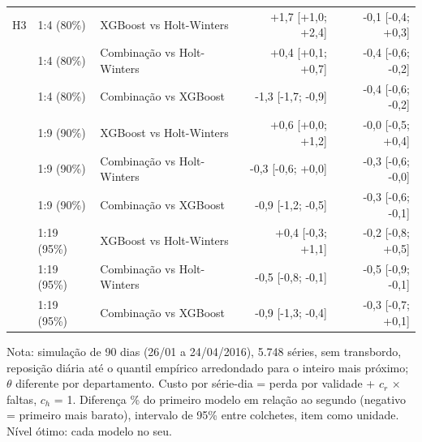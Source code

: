 \begin{table}[htbp]
\begin{tabular}{lllrr}
\addlinespace
H3 & 1:4 (80\%) & XGBoost vs Holt-Winters & +1,7 [+1,0; +2,4] & -0,1 [-0,4; +0,3] \\
 & 1:4 (80\%) & Combinação vs Holt-Winters & +0,4 [+0,1; +0,7] & -0,4 [-0,6; -0,2] \\
 & 1:4 (80\%) & Combinação vs XGBoost & -1,3 [-1,7; -0,9] & -0,4 [-0,6; -0,2] \\
 & 1:9 (90\%) & XGBoost vs Holt-Winters & +0,6 [+0,0; +1,2] & -0,0 [-0,5; +0,4] \\
 & 1:9 (90\%) & Combinação vs Holt-Winters & -0,3 [-0,6; +0,0] & -0,3 [-0,6; -0,0] \\
 & 1:9 (90\%) & Combinação vs XGBoost & -0,9 [-1,2; -0,5] & -0,3 [-0,6; -0,1] \\
 & 1:19 (95\%) & XGBoost vs Holt-Winters & +0,4 [-0,3; +1,1] & -0,2 [-0,8; +0,5] \\
 & 1:19 (95\%) & Combinação vs Holt-Winters & -0,5 [-0,8; -0,1] & -0,5 [-0,9; -0,1] \\
 & 1:19 (95\%) & Combinação vs XGBoost & -0,9 [-1,3; -0,4] & -0,3 [-0,7; +0,1] \\
\bottomrule
\end{tabular}
\par\smallskip
{\footnotesize Nota: simulação de 90 dias (26/01 a 24/04/2016), 5.748 séries, sem transbordo, reposição diária até o quantil empírico arredondado para o inteiro mais próximo; $\theta$ diferente por departamento. Custo por série-dia = perda por validade + $c_r$ × faltas, $c_h$ = 1. Diferença \% do primeiro modelo em relação ao segundo (negativo = primeiro mais barato), intervalo de 95\% entre colchetes, item como unidade. Nível ótimo: cada modelo no seu.}
\end{table}
